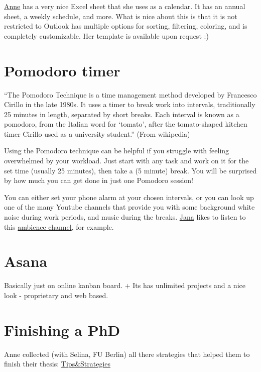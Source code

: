 \documentclass[
]{book}
\begin{document}
\href{https://www.biozentrum.uni-wuerzburg.de/cctb/research/ecosystem-modeling/people/anne-lewerentz/}{Anne}
has a very nice Excel sheet that she uses as a calendar. It has an
annual sheet, a weekly schedule, and more. What is nice about this is
that it is not restricted to Outlook has multiple options for sorting,
filtering, coloring, and is completely customizable. Her template is
available upon request :)

\section{Pomodoro timer}\label{pomodoro-timer}

``The Pomodoro Technique is a time management method developed by
Francesco Cirillo in the late 1980s. It uses a timer to break work into
intervals, traditionally 25 minutes in length, separated by short
breaks. Each interval is known as a pomodoro, from the Italian word for
`tomato', after the tomato-shaped kitchen timer Cirillo used as a
university student.'' (From wikipedia)

Using the Pomodoro technique can be helpful if you struggle with feeling
overwhelmed by your workload. Just start with any task and work on it
for the set time (usually 25 minutes), then take a (5 minute) break. You
will be surprised by how much you can get done in just one Pomodoro
session!

You can either set your phone alarm at your chosen intervals, or you can
look up one of the many Youtube channels that provide you with some
background white noise during work periods, and music during the breaks.
\href{https://www.biozentrum.uni-wuerzburg.de/cctb/research/ecosystem-modeling/people/jana-blechschmidt/}{Jana}
likes to listen to this \href{https://www.youtube.com/c/PeacefulAmbience}{ambience
channel}, for example.

\section{Asana}\label{asana}

Basically just on online kanban board. + Its has unlimited projects and
a nice look - proprietary and web based.

\section{Finishing a PhD}\label{finishing-a-phd}

Anne collected (with Selina, FU Berlin) all there strategies that helped
them to finish their thesis:
\href{https://docs.google.com/spreadsheets/d/1A_tDiVdG4E-zXpFXDHKXBJr95RCt3S41GH64gicyOXM/edit?usp=sharing}{Tips\&Strategies}
\end{document}
